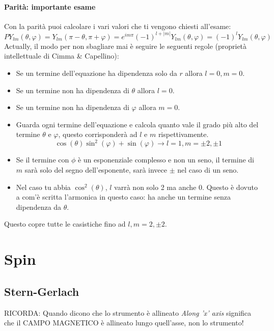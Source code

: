 \paragraph{Parità: importante esame}
Con la parità puoi calcolare i vari valori che ti vengono chiesti all'esame: 
$$PY_{lm}(\theta, \varphi) = Y_{lm}(\pi - \theta, \pi + \varphi) = e^{im\pi}(-1)^{l+|m|} Y_{lm}(\theta, \varphi) = (-1)^lY_{lm}(\theta, \varphi)$$
Actually, il modo per non sbagliare mai è seguire le seguenti regole (proprietà intellettuale di Cimma \& Capellino\texttrademark):
\begin{itemize}
	\item Se un termine dell'equazione ha dipendenza solo da $r$ allora $l=0, m=0$.
	\item Se un termine non ha dipendenza di $\theta$ allora $l=0$.
	\item Se un termine non ha dipendenza di $\varphi$ allora $m=0$.
	\item Guarda ogni termine dell'equazione e calcola quanto vale il grado più alto del termine $\theta$ e $\varphi$, questo corrisponderà ad $l$ e $m$ rispettivamente.
	$$\cos(\theta)\sin^2(\varphi) + \sin(\varphi) \rightarrow l=1, m=\pm2, \pm1$$
	\item Se il termine con $\phi$ è un esponenziale complesso e non un seno, il termine di $m$ sarà solo del segno dell'esponente, sarà invece $\pm$ nel caso di un seno.
	\item Nel caso tu abbia $\cos^2(\theta)$, $l$ varrà non solo 2 ma anche 0. Questo è dovuto a com'è scritta l'armonica in questo caso: ha anche un termine senza dipendenza da $\theta$.
\end{itemize}

\noindent Questo copre tutte le casistiche fino ad $l, m = 2, \pm2$.

\section{Spin}

\subsection{Stern-Gerlach}

RICORDA: Quando dicono che lo strumento è allineato \textit{Along 'x' axis} significa che il CAMPO MAGNETICO è allineato lungo quell'asse, non lo strumento!

\vspace{15pt}

